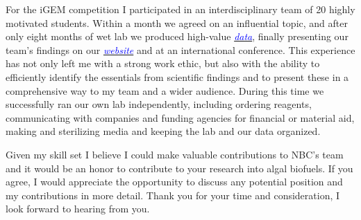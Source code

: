 \documentclass[11pt,a4paper,sans]{moderncv}
\begin{document}
\begin{spacing}{1.15}
For the iGEM competition I participated in an interdisciplinary team of 20 highly motivated students.
Within a month we agreed on an influential topic, and after only eight months of wet lab we produced high-value  {\href{https://www.ncbi.nlm.nih.gov/pubmed/29803867}{\textcolor{blue}{\textit{data}}}}, finally presenting our team's findings on our {\href{http://2015.igem.org/Team:Freiburg}{\textcolor{blue}{\textit{website}}}} and at an international conference. 
This experience has not only left me with a strong work ethic, but also with the ability to efficiently identify the essentials from scientific findings and to present these in a comprehensive way to my team and a wider audience. 
During this time we successfully ran our own lab independently, including ordering reagents, communicating with companies and funding agencies for financial or material aid, making and sterilizing media and keeping the lab and our data organized. \par

Given my skill set I believe I could make valuable contributions to NBC's team and it would be an honor to contribute to your research into algal biofuels. 
If you agree, I would appreciate the opportunity to discuss any potential position and my contributions in more detail. 
Thank you for your time and consideration, I look forward to hearing from you.


 

\end{spacing}
\makeletterclosing
\end{document}

